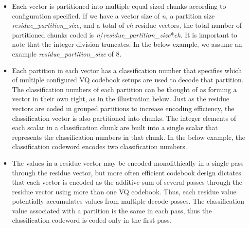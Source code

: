 \begin{itemize}
\item Each vector is partitioned into multiple equal sized chunks
according to configuration specified.  If we have a vector size of
\emph{n}, a partition size \emph{residue_partition_size}, and a total
of \emph{ch} residue vectors, the total number of partitioned chunks
coded is \emph{n}/\emph{residue_partition_size}*\emph{ch}.  It is
important to note that the integer division truncates.  In the below
example, we assume an example \emph{residue_partition_size} of 8.

\item Each partition in each vector has a classification number that
specifies which of multiple configured VQ codebook setups are used to
decode that partition.  The classification numbers of each partition
can be thought of as forming a vector in their own right, as in the
illustration below.  Just as the residue vectors are coded in grouped
partitions to increase encoding efficiency, the classification vector
is also partitioned into chunks.  The integer elements of each scalar
in a classification chunk are built into a single scalar that
represents the classification numbers in that chunk.  In the below
example, the classification codeword encodes two classification
numbers.

\item The values in a residue vector may be encoded monolithically in a
single pass through the residue vector, but more often efficient
codebook design dictates that each vector is encoded as the additive
sum of several passes through the residue vector using more than one
VQ codebook.  Thus, each residue value potentially accumulates values
from multiple decode passes.  The classification value associated with
a partition is the same in each pass, thus the classification codeword
is coded only in the first pass.

\end{itemize}


